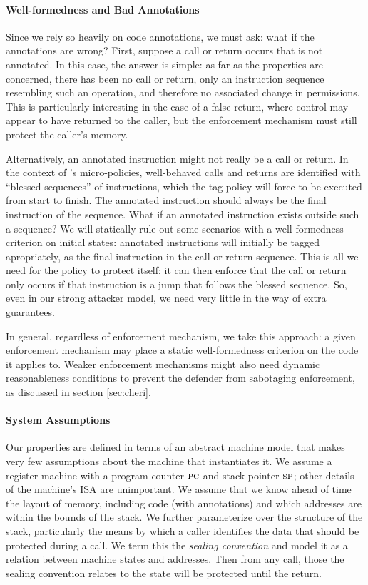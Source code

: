 \documentclass[acmsmall,review,anonymous]{acmart}\settopmatter{printfolios=true,printccs=false,printacmref=false}
\begin{document}
\paragraph*{Well-formedness and Bad Annotations}

Since we rely so heavily on code annotations, we must ask: what if the annotations
are wrong? First, suppose a call or return occurs that is not annotated.
In this case, the answer is simple: as far as the properties are concerned, there has
been no call or return, only an instruction sequence resembling such an operation, and
therefore no associated change in permissions. This is particularly interesting in the
case of a false return, where control may appear to have returned to the caller, but
the enforcement mechanism must still protect the caller's memory.

Alternatively, an annotated instruction might not really be a call or return.
In the context of \citeauthor{DBLP:conf/sp/RoesslerD18}'s micro-policies, well-behaved calls
and returns are identified with ``blessed sequences'' of instructions, which the tag policy
will force to be executed from start to finish. The annotated instruction should always
be the final instruction of the sequence. What if an annotated instruction exists outside
such a sequence? We will statically rule out some scenarios with a well-formedness criterion
on initial states: annotated instructions will initially be tagged apropriately, as the
final instruction in the call or return sequence. This is all we need for the policy to
protect itself: it can then enforce that the call or return only occurs if that instruction
is a jump that follows the blessed sequence. So, even in our strong attacker model, we need
very little in the way of extra guarantees.

In general, regardless of enforcement mechanism, we take this approach:
a given enforcement mechanism may place a static well-formedness criterion
on the code it applies to. Weaker enforcement mechanisms might also need dynamic
reasonableness conditions to prevent the defender from sabotaging enforcement, as
discussed in section \ref{sec:cheri}.

\paragraph*{System Assumptions}

Our properties are defined in terms of an abstract machine model that makes very few
assumptions about the machine that instantiates it.  We assume a register
machine with a program counter \(\textsc{pc}\) and stack pointer \(\textsc{sp}\); other
details of the machine's ISA are unimportant. We assume that we know ahead of time
the layout of memory, including code (with annotations) and which addresses are within
the bounds of the stack.
%
We further parameterize over the structure of the stack, particularly the means by
which a caller identifies the data that should be protected during a call. We term
this the {\em sealing convention} and model it as a relation between machine states
and addresses. Then from any call, those the sealing convention relates to the
state will be protected until the return.
\end{document}
